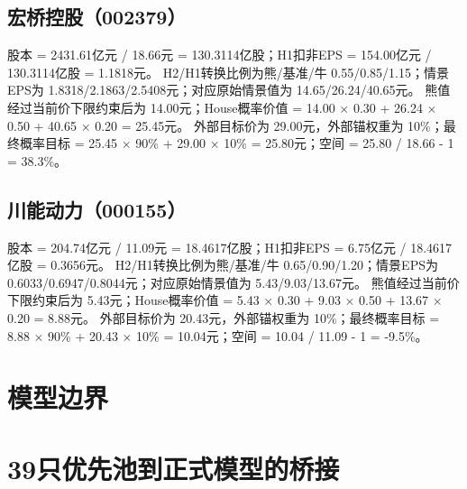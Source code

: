 \subsection{宏桥控股（002379）}
股本 = 2431.61亿元 / 18.66元 = 130.3114亿股；H1扣非EPS = 154.00亿元 / 130.3114亿股 = 1.1818元。
H2/H1转换比例为熊/基准/牛 0.55/0.85/1.15；情景EPS为 1.8318/2.1863/2.5408元；对应原始情景值为 14.65/26.24/40.65元。
熊值经过当前价下限约束后为 14.00元；House概率价值 = 14.00 × 0.30 + 26.24 × 0.50 + 40.65 × 0.20 = 25.45元。
外部目标价为 29.00元，外部锚权重为 10\%；最终概率目标 = 25.45 × 90\% + 29.00 × 10\% = 25.80元；空间 = 25.80 / 18.66 - 1 = 38.3\%。

\subsection{川能动力（000155）}
股本 = 204.74亿元 / 11.09元 = 18.4617亿股；H1扣非EPS = 6.75亿元 / 18.4617亿股 = 0.3656元。
H2/H1转换比例为熊/基准/牛 0.65/0.90/1.20；情景EPS为 0.6033/0.6947/0.8044元；对应原始情景值为 5.43/9.03/13.67元。
熊值经过当前价下限约束后为 5.43元；House概率价值 = 5.43 × 0.30 + 9.03 × 0.50 + 13.67 × 0.20 = 8.88元。
外部目标价为 20.43元，外部锚权重为 10\%；最终概率目标 = 8.88 × 90\% + 20.43 × 10\% = 10.04元；空间 = 10.04 / 11.09 - 1 = -9.5\%。

\section{模型边界}

\section{39只优先池到正式模型的桥接}

